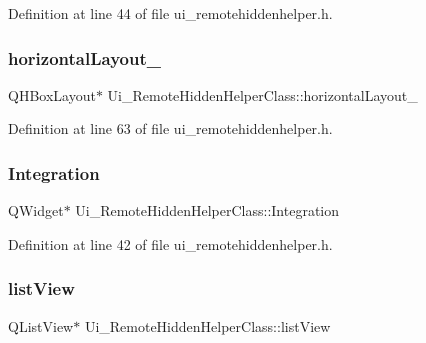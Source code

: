 Definition at line 44 of file ui\+\_\+remotehiddenhelper.\+h.

\hypertarget{class_ui___remote_hidden_helper_class_a2f6542559743da2dda19c64adc2c9293}{}\label{class_ui___remote_hidden_helper_class_a2f6542559743da2dda19c64adc2c9293} 
\subsubsection{\texorpdfstring{horizontal\+Layout\+\_}{horizontalLayout\_4}}
{\footnotesize\ttfamily Q\+H\+Box\+Layout$\ast$ Ui\+\_\+\+Remote\+Hidden\+Helper\+Class\+::horizontal\+Layout\+\_}



Definition at line 63 of file ui\+\_\+remotehiddenhelper.\+h.

\hypertarget{class_ui___remote_hidden_helper_class_ab2f4e6915ef33b574ce662be194b9180}{}\label{class_ui___remote_hidden_helper_class_ab2f4e6915ef33b574ce662be194b9180} 
\subsubsection{\texorpdfstring{Integration}{Integration}}
{\footnotesize\ttfamily Q\+Widget$\ast$ Ui\+\_\+\+Remote\+Hidden\+Helper\+Class\+::\+Integration}



Definition at line 42 of file ui\+\_\+remotehiddenhelper.\+h.

\hypertarget{class_ui___remote_hidden_helper_class_a7c39b8238e6c9fc7943d801213bd76e8}{}\label{class_ui___remote_hidden_helper_class_a7c39b8238e6c9fc7943d801213bd76e8} 
\subsubsection{\texorpdfstring{list\+View}{listView}}
{\footnotesize\ttfamily Q\+List\+View$\ast$ Ui\+\_\+\+Remote\+Hidden\+Helper\+Class\+::list\+View}




